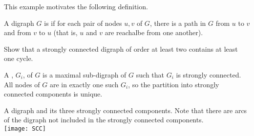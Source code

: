 This example motivates the following definition.

\begin{Definition}
A digraph $G$ is  if for each pair of nodes $u, v$ 
of $G$, there is a path in $G$ from $u$ to $v$ and from $v$ to $u$ (that is, $u$ and $v$ are reachalbe from one another).
\end{Definition}

\begin{Boxample}[4]
Show that a strongly connected digraph of order at least two contains at least one cycle.
\end{Boxample}



\begin{Definition} A , $G_i$, of $G$ is a maximal sub-digraph of $G$ such that $G_i$ is strongly connected. All nodes of $G$ are in exactly one such $G_i$, so the partition into strongly connected components is unique.
\end{Definition}

%

\begin{Boxample}[0]\label{eg:scc}
A digraph and its three strongly connected
components. Note that there are
arcs of the digraph not included in the strongly connected components.\\
\texttt{[image: SCC]}
\end{Boxample}

